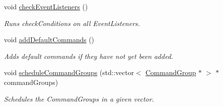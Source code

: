 \begin{DoxyCompactItemize}
void \mbox{\hyperlink{classlib_iterative_robot_1_1_event_scheduler_af5c6b0f9d31490e9ede73efe4858373a}{check\+Event\+Listeners}} ()
\begin{DoxyCompactList}\small\item\em Runs check\+Conditions on all Event\+Listeners. \end{DoxyCompactList}\item 
\mbox{\label{classlib_iterative_robot_1_1_event_scheduler_aca83cc87b630a3de91376108302122d5}} 
void \mbox{\hyperlink{classlib_iterative_robot_1_1_event_scheduler_aca83cc87b630a3de91376108302122d5}{add\+Default\+Commands}} ()
\begin{DoxyCompactList}\small\item\em Adds default commands if they have not yet been added. \end{DoxyCompactList}\item 
void \mbox{\hyperlink{classlib_iterative_robot_1_1_event_scheduler_aa516958158457164590a1d092891c05c}{schedule\+Command\+Groups}} (std\+::vector$<$ \mbox{\hyperlink{classlib_iterative_robot_1_1_command_group}{Command\+Group}} $\ast$ $>$ $\ast$command\+Groups)
\begin{DoxyCompactList}\small\item\em Schedules the Command\+Groups in a given vector. \end{DoxyCompactList}\end{DoxyCompactItemize}
